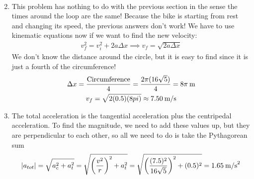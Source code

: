 \documentclass{article}
\begin{document}
\begin{enumerate}
\begin{gather*}
  \end{gather*}
\item This problem has nothing to do with the previous section in the sense the times around the loop are the same!  Because the bike is starting from rest and changing its speed, the previous answers don't work! We have to use kinematic equations now if we want to find the new velocity:
  \begin{gather*}
    v_f^2=v_i^2+2a\Delta x \implies v_f=\sqrt{2a\Delta x}
  \end{gather*}
  We don't know the distance around the circle, but it is easy to find since it is just a fourth of the circumference!
  \begin{gather*}
    \Delta x = \frac{\text{Circumference}}{4} = \frac{2\pi(16\sqrt{5})}{4}=8\pi \text{\:m} \\
    v_f = \sqrt{2(0.5)(8pi)} \approx 7.50 \text{\:m/s}
  \end{gather*}
\item The total acceleration is the tangential acceleration plus the centripedal acceleration.  To find the magnitude, we need to add these values up, but they are perpendicular to each other, so all we need to do is take the Pythagorean sum
  \begin{gather*}
    |a_{tot}|=\sqrt{a_c^2+a_t^2}=\sqrt{ \left(\frac{v^2}{r}\right)^2+a_t^2}=\sqrt{ \left(\frac{(7.5)^2}{16\sqrt{5}}\right)^2+(0.5)^2}=1.65\text{\:m/s}^2
  \end{gather*}
\end{enumerate}
\end{document}
